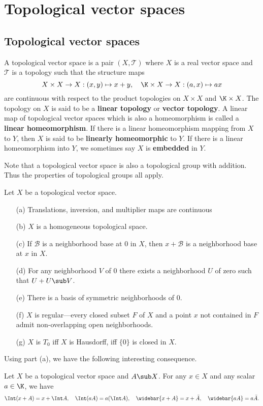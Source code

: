 \chapter{Topological vector spaces}
\section{Topological vector spaces}
A topological vector space is a pair $(X,\mathcal{T})$ where $X$ is a real vector space and $\mathcal{T}$ is a topology such that the structure maps
\[X\times X\to X:(x,y)\mapsto x+y,\quad \K\times X\to X:(a,x)\mapsto a x\]
are continuous with respect to the product topologies on $X\times X$ and $\K\times X$. The topology on $X$ is said to be a \textbf{linear topology} or \textbf{vector topology}. A linear map of topological vector spaces which is also a homeomorphism is called a \textbf{linear homeomorphism}. If there is a linear homeomorphism mapping from $X$ to $Y$, then $X$ is said to be \textbf{linearly homeomorphic} to $Y$. If there is a linear homeomorphism into $Y$, we sometimes say $X$ is \textbf{embedded} in $Y$.\par
Note that a topological vector space is also a topological group with addition. Thus the properties of topological groups all apply.
\begin{proposition}
Let $X$ be a topological vector space.
\begin{itemize}
\item[(a)] Translations, inversion, and multiplier maps are continuous
\item[(b)] $X$ is a homogeneous topological space.
\item[(c)] If $\mathcal{B}$ is a neighborhood base at $0$ in $X$, then $x+\mathcal{B}$ is a neighborhood base at $x$ in $X$.
\item[(d)] For any neighborhood $V$ of $0$ there exists a neighborhood $U$ of zero such that $U+U\sub V$.
\item[(e)] There is a basis of symmetric neighborhoods of $0$.  
\item[(f)] $X$ is regular---every closed subset $F$ of $X$ and a point $x$ not contained in $F$ admit non-overlapping open neighborhoods.
\item[(g)] $X$ is $T_0$ iff $X$ is Hausdorff, iff $\{0\}$ is closed in $X$. 
\end{itemize}
\end{proposition}
Using part (a), we have the following interesting consequence.
\begin{corollary}
Let $X$ be a topological vector space and $A\sub X$. For any $x\in X$ and any scalar $a\in\K$, we have
\[\Int(x+A)=x+\Int A,\quad \Int(aA)=a(\Int A),\quad \widebar{x+A}=x+\bar{A},\quad\widebar{aA}=a\bar{A}.\]
\end{corollary}
